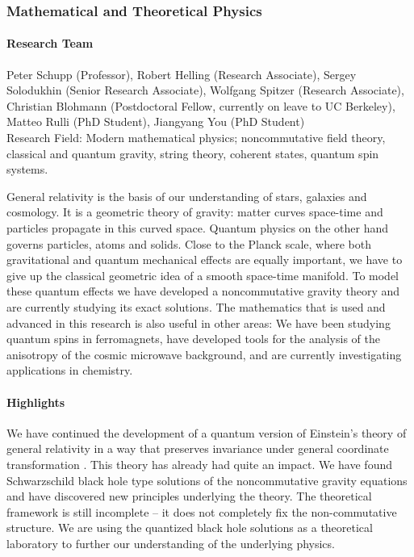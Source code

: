 \subsubsection{Mathematical and Theoretical Physics}

\paragraph{Research Team}
Peter Schupp (Professor), Robert Helling (Research Associate),
Sergey Solodukhin (Senior Research Associate), Wolfgang Spitzer
(Research Associate), Christian Blohmann  (Postdoctoral Fellow,
currently on leave to UC Berkeley),
 Matteo Rulli (PhD Student), %
  Jiangyang You (PhD Student)\\

Research Field: Modern mathematical physics; noncommutative field
theory, classical and quantum gravity, string theory, coherent
states, quantum spin systems.

General relativity is the basis of our understanding of stars,
galaxies and cosmology. It is a geometric theory of gravity: matter
curves space-time and particles propagate in this curved space.
Quantum physics on the other hand governs particles, atoms and
solids. Close to the Planck scale, where both gravitational and
quantum mechanical effects are equally important, we have to give up
the classical geometric idea of a smooth space-time manifold. To
model these quantum effects we have developed a noncommutative
gravity theory and are currently studying its exact solutions. The
mathematics that is used and advanced in this research is also
useful in other areas: We have been studying quantum spins in
ferromagnets, have developed tools for the analysis of the
anisotropy of the cosmic microwave background, and are currently
investigating applications in chemistry.

\paragraph{Highlights}

 We have continued the
development of a quantum version of Einstein's theory of general
relativity in a way that preserves invariance under general
coordinate transformation \cite{Aschieri:2005yw}. This theory has
already had quite an impact. We have found Schwarzschild black hole
type solutions of the noncommutative gravity equations and have
discovered new principles underlying the theory. The theoretical
framework is still incomplete -- it does not completely fix the
non-commutative structure. We are using the quantized black hole
solutions as a theoretical laboratory to further our understanding
of the underlying physics.

